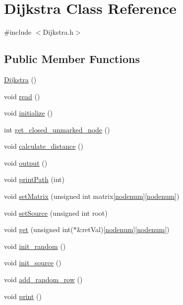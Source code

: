 \hypertarget{class_dijkstra}{\section{Dijkstra Class Reference}
\label{class_dijkstra}
}


{\ttfamily \#include $<$Dijkstra.\-h$>$}

\subsection*{Public Member Functions}
\begin{DoxyCompactItemize}
\item 
\hyperlink{class_dijkstra_ad7c7bb035ef96e4dbd652fe2bd11a2be}{Dijkstra} ()
\item 
void \hyperlink{class_dijkstra_a17070869ad646e4ac13a656b6f9adea4}{read} ()
\item 
void \hyperlink{class_dijkstra_a0f7f7f26abbe38dc975d1b73da1fd352}{initialize} ()
\item 
int \hyperlink{class_dijkstra_ac2ec4910268eec4102f0d975e30b15e1}{get\-\_\-closed\-\_\-unmarked\-\_\-node} ()
\item 
void \hyperlink{class_dijkstra_a5e89b20c9c846ae30233ee673468828d}{calculate\-\_\-distance} ()
\item 
void \hyperlink{class_dijkstra_a267c5426563ba083712d16115bdf363b}{output} ()
\item 
void \hyperlink{class_dijkstra_a45305244759e1634249dc04438c3e207}{print\-Path} (int)
\item 
void \hyperlink{class_dijkstra_abab5bebfb4f89acf4390b4655f2428f9}{set\-Matrix} (unsigned int matrix\mbox{[}\hyperlink{_dijkstra_8h_aa29fcfa28efeea5e1694715520e60b49}{nodenum}\mbox{]}\mbox{[}\hyperlink{_dijkstra_8h_aa29fcfa28efeea5e1694715520e60b49}{nodenum}\mbox{]})
\item 
void \hyperlink{class_dijkstra_a4a4d9e8545a192e43d4b3e7a13bde7fd}{set\-Source} (unsigned int root)
\item 
void \hyperlink{class_dijkstra_adba7a1ab714405b5ab61f8a4164dd79c}{get} (unsigned int($\ast$\&ret\-Val)\mbox{[}\hyperlink{_dijkstra_8h_aa29fcfa28efeea5e1694715520e60b49}{nodenum}\mbox{]}\mbox{[}\hyperlink{_dijkstra_8h_aa29fcfa28efeea5e1694715520e60b49}{nodenum}\mbox{]})
\item 
void \hyperlink{class_dijkstra_a3e22e99ed588f13d52fd148e939603ae}{init\-\_\-random} ()
\item 
void \hyperlink{class_dijkstra_a895b4b70518d4fb64d0471db438da3cc}{init\-\_\-source} ()
\item 
void \hyperlink{class_dijkstra_ac64f1ba2cf387f1171f7d388eab19c16}{add\-\_\-random\-\_\-row} ()
\item 
void \hyperlink{class_dijkstra_aa41d80c91c1d233a9c3eeb0a19358f68}{print} ()
\end{DoxyCompactItemize}


